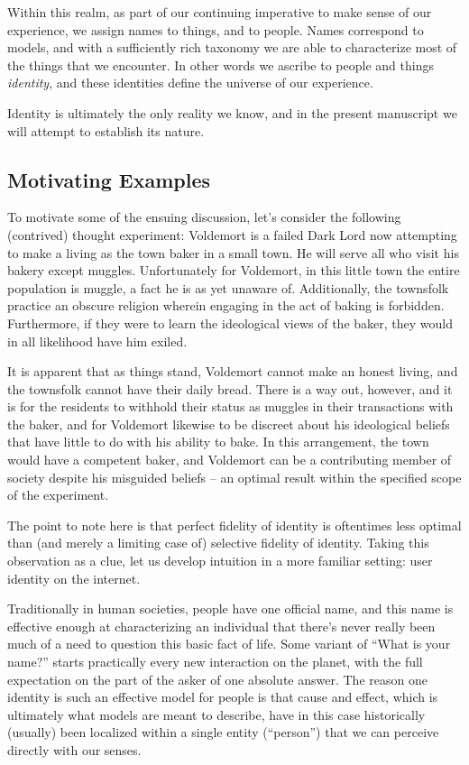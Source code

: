\documentclass[pra,twocolumn,groupedaddress,10pt]{revtex4}
\theoremstyle{definition}
\begin{document}
Within this realm, as part of our continuing imperative to make sense of our experience, we assign names to things, and to people. Names correspond to models, and with a sufficiently rich taxonomy we are able to characterize most of the things that we encounter. In other words we ascribe to people and things \textit{identity}, and these identities define the universe of our experience.

Identity is ultimately the only reality we know, and in the present manuscript we will attempt to establish its nature.

\subsection{Motivating Examples} \label{sec:motexa}

To motivate some of the ensuing discussion, let's consider the following (contrived) thought experiment: Voldemort is a failed Dark Lord now attempting to make a living as the town baker in a small town. He will serve all who visit his bakery except muggles. Unfortunately for Voldemort, in this little town the entire population is muggle, a fact he is as yet unaware of. Additionally, the townsfolk practice an obscure religion wherein engaging in the act of baking is forbidden. Furthermore, if they were to learn the ideological views of the baker, they would in all likelihood have him exiled.

It is apparent that as things stand, Voldemort cannot make an honest living, and the townsfolk cannot have their daily bread. There is a way out, however, and it is for the residents to withhold their status as muggles in their transactions with the baker, and for Voldemort likewise to be discreet about his ideological beliefs that have little to do with his ability to bake. In this arrangement, the town would have a competent baker, and Voldemort can be a contributing member of society despite his misguided beliefs -- an optimal result within the specified scope of the experiment.

The point to note here is that perfect fidelity of identity is oftentimes less optimal than (and merely a limiting case of) selective fidelity of identity. Taking this observation as a clue, let us develop intuition in a more familiar setting: user identity on the internet.

Traditionally in human societies, people have one official name, and this name is effective enough at characterizing an individual that there's never really been much of a need to question this basic fact of life. Some variant of ``What is your name?'' starts practically every new interaction on the planet, with the full expectation on the part of the asker of one absolute answer. The reason one identity is such an effective model for people is that cause and effect, which is ultimately what models are meant to describe, have in this case historically (usually) been localized within a single entity (``person'') that we can perceive directly with our senses.
\end{document}
